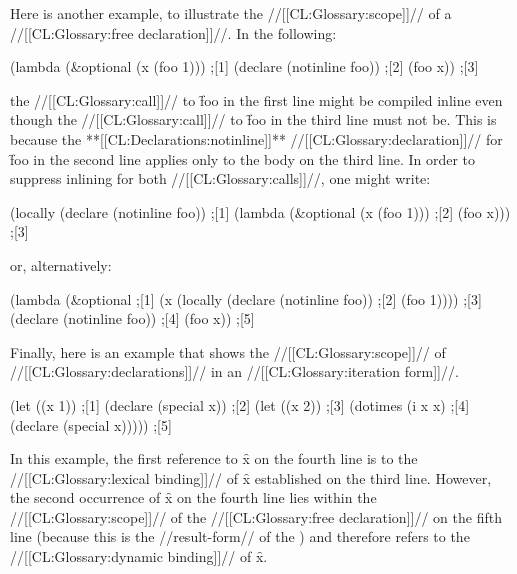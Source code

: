 Here is another example, to illustrate the //[[CL:Glossary:scope]]// of a //[[CL:Glossary:free declaration]]//.  In the following:

\code
 (lambda (&optional (x (foo 1))) ;[1]
   (declare (notinline foo))     ;[2]
   (foo x))                      ;[3] \endcode

the //[[CL:Glossary:call]]// to \f{foo} in the first line might be  compiled inline even though the //[[CL:Glossary:call]]// to \f{foo} in the third line must not be.  This is because the **[[CL:Declarations:notinline]]** //[[CL:Glossary:declaration]]// for \f{foo} in the second line applies only to the body on the third line.  In order to suppress inlining for both //[[CL:Glossary:calls]]//,  one might write:

\code
 (locally (declare (notinline foo)) ;[1]
   (lambda (&optional (x (foo 1)))  ;[2]
     (foo x)))                      ;[3] \endcode

or, alternatively:

\code
 (lambda (&optional                               ;[1]
            (x (locally (declare (notinline foo)) ;[2]
                 (foo 1))))                       ;[3]
   (declare (notinline foo))                      ;[4]
   (foo x))                                       ;[5] \endcode

Finally, here is an example that shows the //[[CL:Glossary:scope]]// of //[[CL:Glossary:declarations]]// in an //[[CL:Glossary:iteration form]]//.

\code
 (let ((x  1))                     ;[1]
   (declare (special x))           ;[2]
     (let ((x 2))                  ;[3]
       (dotimes (i x x)            ;[4]
         (declare (special x)))))  ;[5]  \endcode

In this example, the first reference to \f{x} on the fourth line is to the //[[CL:Glossary:lexical binding]]// of \f{x} established on the third line. However, the second occurrence of \f{x} on the fourth line lies within the //[[CL:Glossary:scope]]// of the //[[CL:Glossary:free declaration]]// on the fifth line (because this is the //result-form// of the ) and therefore refers to the //[[CL:Glossary:dynamic binding]]// of \f{x}.

\endsubsubsection%

\endSubsection%
